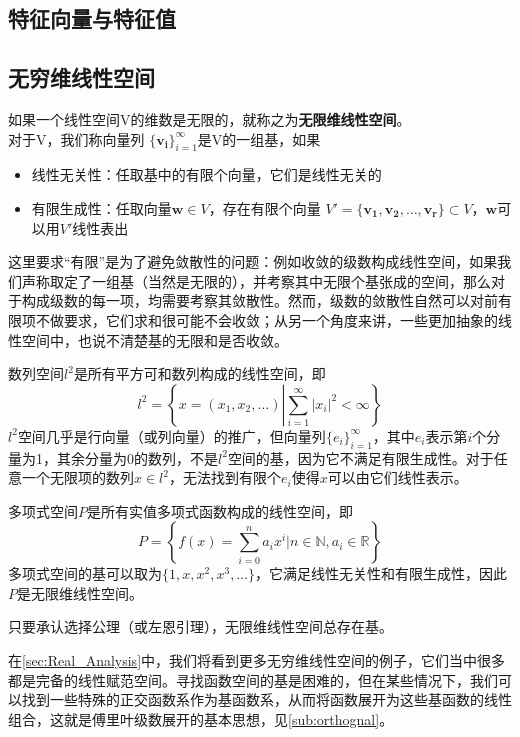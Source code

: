 \subsection{特征向量与特征值}\label{sub:eigenvector}

\subsection{无穷维线性空间}\label{sub:infinite_linear}

\begin{definition}[无限维线性空间和基]
    如果一个线性空间V的维数是无限的，就称之为\textbf{无限维线性空间}。\\
对于V，我们称向量列
$\lbrace\mathbf{v_i}\rbrace_{i=1}^{\infty}$是V的一组基，如果
\begin{itemize}
    \item 线性无关性：任取基中的有限个向量，它们是线性无关的
    \item 有限生成性：任取向量$\mathbf{w} \in V$，存在有限个向量
          $V'=\lbrace\mathbf{v_1,v_2,\dots,v_r}\rbrace\subset V $，$\mathbf{w}$可以用$V'$线性表出
\end{itemize}
\end{definition}
这里要求“有限”是为了避免敛散性的问题：例如收敛的级数构成线性空间，如果我们声称取定了一组基（当然是无限的），并考察其中无限个基张成的空间，那么对于构成级数的每一项，均需要考察其敛散性。然而，级数的敛散性自然可以对前有限项不做要求，它们求和很可能不会收敛；从另一个角度来讲，一些更加抽象的线性空间中，也说不清楚基的无限和是否收敛。

\begin{example}
    数列空间$l^2$是所有平方可和数列构成的线性空间，即
    \[l^2=\left\{x=(x_1,x_2,\ldots)\left|\sum_{i=1}^{\infty}|x_i|^2<\infty\right.\right\}\]
    $l^2$空间几乎是行向量（或列向量）的推广，但向量列$\{e_i\}_{i=1}^{\infty}$，其中$e_i$表示第$i$个分量为1，其余分量为0的数列，不是$l^2$空间的基，因为它不满足有限生成性。对于任意一个无限项的数列$x\in l^2$，无法找到有限个$e_i$使得$x$可以由它们线性表示。
\end{example}
\begin{example}
    多项式空间$P$是所有实值多项式函数构成的线性空间，即
    \[P=\left\{f(x)=\sum_{i=0}^{n}a_i x^i|n\in \mathbb{N},a_i\in \mathbb{R}\right\}\]
    多项式空间的基可以取为$\{1,x,x^2,x^3,\ldots\}$，它满足线性无关性和有限生成性，因此$P$是无限维线性空间。
\end{example}

\begin{claim}
    只要承认选择公理（或左恩引理），无限维线性空间总存在基。
\end{claim}

在\ref{sec:Real_Analysis}中，我们将看到更多无穷维线性空间的例子，它们当中很多都是完备的线性赋范空间。寻找函数空间的基是困难的，但在某些情况下，我们可以找到一些特殊的正交函数系作为基函数系，从而将函数展开为这些基函数的线性组合，这就是傅里叶级数展开的基本思想，见\ref{sub:orthognal}。